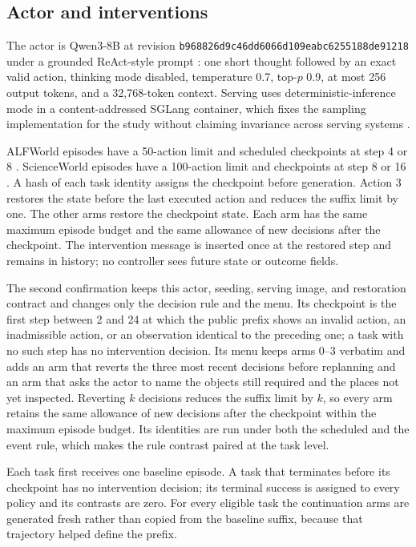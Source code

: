 \subsection{Actor and interventions}

The actor is Qwen3-8B at revision \texttt{b968826d9c46dd6066d109eabc6255188de91218} \citep{yang2025qwen3} under a grounded ReAct-style prompt \citep{yao2023react}: one short thought followed by an exact valid action, thinking mode disabled, temperature 0.7, top-$p$ 0.9, at most 256 output tokens, and a 32,768-token context. Serving uses deterministic-inference mode in a content-addressed SGLang container, which fixes the sampling implementation for the study without claiming invariance across serving systems \citep{bjarnason2026randomness}.

ALFWorld episodes have a 50-action limit and scheduled checkpoints at step 4 or 8 \citep{shridhar2021alfworld}. ScienceWorld episodes have a 100-action limit and checkpoints at step 8 or 16 \citep{wang2022scienceworld}. A hash of each task identity assigns the checkpoint before generation. Action 3 restores the state before the last executed action and reduces the suffix limit by one. The other arms restore the checkpoint state. Each arm has the same maximum episode budget and the same allowance of new decisions after the checkpoint. The intervention message is inserted once at the restored step and remains in history; no controller sees future state or outcome fields.

The second confirmation keeps this actor, seeding, serving image, and restoration contract and changes only the decision rule and the menu. Its checkpoint is the first step between 2 and 24 at which the public prefix shows an invalid action, an inadmissible action, or an observation identical to the preceding one; a task with no such step has no intervention decision. Its menu keeps arms 0--3 verbatim and adds an arm that reverts the three most recent decisions before replanning and an arm that asks the actor to name the objects still required and the places not yet inspected. Reverting $k$ decisions reduces the suffix limit by $k$, so every arm retains the same allowance of new decisions after the checkpoint within the maximum episode budget. Its \EventPlanned{} identities are run under both the scheduled and the event rule, which makes the rule contrast paired at the task level.

Each task first receives one baseline episode. A task that terminates before its checkpoint has no intervention decision; its terminal success is assigned to every policy and its contrasts are zero. For every eligible task the continuation arms are generated fresh rather than copied from the baseline suffix, because that trajectory helped define the prefix.

